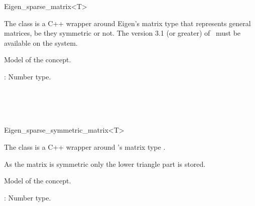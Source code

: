 \ccRefPageBegin
\begin{ccRefClass}{Eigen_sparse_matrix<T>}

\ccDefinition

The class  is a C++ wrapper around Eigen's matrix type 
that represents general matrices, be they symmetric or not.
The version 3.1 (or greater) of \eigen\ must be available on the system.


\ccIsModel
Model of the  concept.

\ccParameters
{}: Number type.

\ccTypes
{}

\ccSeeAlso

  \\
  \\
  \\

\end{ccRefClass}

\begin{ccRefClass}{Eigen_sparse_symmetric_matrix<T>}

\ccDefinition

The class  is a C++ wrapper around \eigen's matrix type .

As the matrix is symmetric only the lower triangle part is stored.


\ccIsModel
Model of the  concept.

\ccParameters
{}: Number type.

\ccTypes
{}

\ccSeeAlso

  \\
  \\
  \\

\end{ccRefClass}

\ccRefPageEnd
